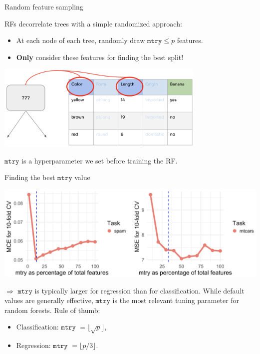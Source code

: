 \documentclass[11pt,compress,t,notes=noshow, xcolor=table]{beamer}
\begin{document}
\begin{vbframe}{Random feature sampling}

RFs decorrelate trees with a simple randomized approach:

\begin{itemize}
  \item At each node of each tree, randomly draw $\texttt{mtry} \le p$ features.
  \item \textbf{Only} consider these features for finding the best split!
\end{itemize}

\begin{center}
\includegraphics[width=0.75\textwidth]{figure_man/forest-feature-sampling.png}
\end{center}

$\texttt{mtry}$ is a hyperparameter we set before training the RF.

\end{vbframe}

\begin{vbframe}{Finding the best $\texttt{mtry}$ value}

\begin{center}
\includegraphics[width=1\textwidth]{figure/forest-mtry.png}
\end{center}

$\Rightarrow$ $\texttt{mtry}$ is typically larger for regression than for classification. While default values are generally effective, $\texttt{mtry}$ is the most relevant tuning parameter for random forests. Rule of thumb:

\begin{itemize}
\item Classification: $\texttt{mtry}$ $ = \lfloor \sqrt{p} \rfloor$,
\item Regression: $\texttt{mtry}$ $ = \lfloor p/3 \rfloor$.
\end{itemize}

\end{vbframe}
\end{document}
